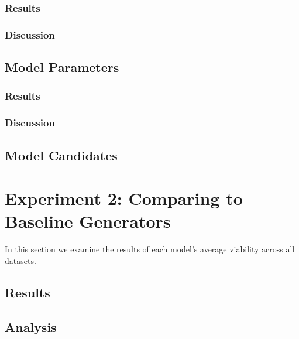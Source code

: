 \documentclass[12pt,a4paper]{report}
\begin{document}
\subsubsection{Results}

\subsubsection{Discussion}

\subsection{Model Parameters}
\subsubsection{Results}

\subsubsection{Discussion}

\subsection{Model Candidates}




\section{Experiment 2: Comparing to Baseline Generators}
\label{sec:overall}
In this section we examine the results of each model's average viability across all datasets. 
\subsection{Results}


\subsection{Analysis}


\end{document}
